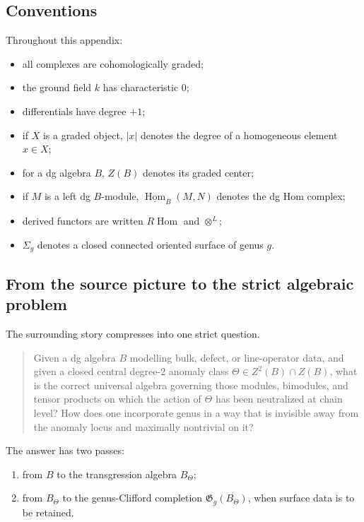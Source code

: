 \subsection{Conventions}
\label{subsec:tholog-conventions}

Throughout this appendix:
\begin{itemize}
\item all complexes are cohomologically graded;
\item the ground field \(k\) has characteristic \(0\);
\item differentials have degree \(+1\);
\item if \(X\) is a graded object, \(|x|\) denotes the degree of a homogeneous element \(x\in X\);
\item for a dg algebra \(B\), \(Z(B)\) denotes its graded center;
\item if \(M\) is a left dg \(B\)-module, \(\underline{\operatorname{Hom}}_{B}(M,N)\) denotes the dg Hom complex;
\item derived functors are written \(R\!\operatorname{Hom}\) and \(\otimes^{L}\);
\item \(\Sigma_{g}\) denotes a closed connected oriented surface of genus \(g\).
\end{itemize}

\subsection{From the source picture to the strict algebraic problem}
\label{subsec:tholog-source-picture}

The surrounding story compresses into one strict question.

\begin{quote}
Given a dg algebra \(B\) modelling bulk, defect, or line-operator data, and given a closed central degree-\(2\) anomaly class
\(\Theta\in Z^{2}(B)\cap Z(B)\),
what is the correct universal algebra governing those modules, bimodules, and tensor products on which the action of \(\Theta\) has been neutralized at chain level?
How does one incorporate genus in a way that is invisible away from the anomaly locus and maximally nontrivial on it?
\end{quote}

The answer has two passes:
\begin{enumerate}
\item from \(B\) to the transgression algebra \(B_{\Theta}\);
\item from \(B_{\Theta}\) to the genus-Clifford completion \(\mathfrak{G}_{g}(B_{\Theta})\), when surface data is to be retained.
\end{enumerate}

